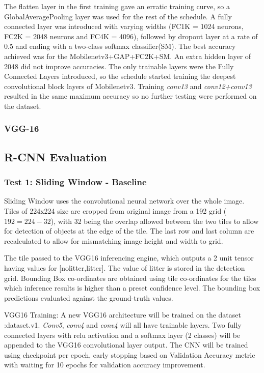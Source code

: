 \documentclass{IEEEtran}
\begin{document}
The flatten layer in the first training gave an erratic training curve, so a GlobalAveragePooling layer was used for the rest of the schedule. A fully connected layer was introduced with varying widths (FC1K = 1024 neurons, FC2K = 2048 neurons and FC4K = 4096), followed by dropout layer at a rate of 0.5 and ending with a two-class softmax classifier(SM). The best accuracy achieved was for the Mobilenetv3+GAP+FC2K+SM. An extra hidden layer of 2048 did not improve accuracies. The only trainable layers were the Fully Connected Layers introduced, so the schedule started training the deepest convolutional block layers of Mobilenetv3. Training \textit{conv13 }and \textit{conv12+conv13 } resulted in the same maximum accuracy so no further testing were performed on the dataset.



\subsubsection{VGG-16}

\subsection{R-CNN Evaluation}

\subsubsection{Test 1: Sliding Window - Baseline}

Sliding Window uses the convolutional neural network over the whole image. Tiles of 224x224 size are cropped from original image from a 192 grid ($192 = 224-32$), with 32 being the overlap allowed between the two tiles to allow for detection of objects at the edge of the tile. The last row and last column are recalculated to allow for mismatching image height and width to grid. \newline

The tile passed to the VGG16 inferencing engine, which outputs a 2 unit tensor having values for [nolitter,litter]. The value of litter is stored in the detection grid. Bounding Box co-ordinates are obtained using tile co-ordinates for the tiles which inference results is higher than a preset confidence level. The bounding box predictions evaluated against the ground-truth values.\newline

VGG16 Training: A new VGG16 architecture will be trained on the dataset :dataset.v1. \textit{Conv5}, \textit{conv4} and \textit{conv4} will all have trainable layers. Two fully connected layers with relu activation and a softmax layer (2 classes) will be appended to the VGG16 convolutional layer output.
The CNN will be trained using checkpoint per epoch, early stopping based on Validation Accuracy metric with waiting for 10 epochs for validation accuracy improvement. 
\end{document}
